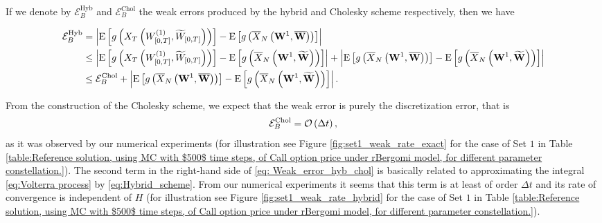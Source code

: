 \begin{conjecture}\label{conj: Weak error structure}
If we denote by $\mathcal{E}_{B}^{\text{Hyb}}$ and $\mathcal{E}_{B}^{\text{Chol}}$ the weak errors produced by the hybrid and Cholesky scheme respectively, then we have
\begin{small}
\begin{align}\label{eq: Weak_error_hyb_chol}
\mathcal{E}_{B}^{\text{Hyb}}&=\left\lvert\mathrm{E}\left[g\left(X_T\left(W^{(1)}_{[0,T]},\widetilde{W}_{[0,T]}\right) \right)\right]-\mathrm{E}\left[g\left(\overline{X}_N\left(\mathbf{W}^{1}, \overline{\mathbf{W}}\right) \right)\right]\right\rvert \nonumber\\
&\le \left\lvert\mathrm{E}\left[g\left(X_T\left(W^{(1)}_{[0,T]},\widetilde{W}_{[0,T]}\right)\right)\right]-\mathrm{E}\left[g\left(\overline{X}_N\left(\mathbf{W}^{1}, \widetilde{\mathbf{W}}\right)\right)\right]\right\rvert+ \left\lvert \mathrm{E}\left[g\left(\overline{X}_N\left(\mathbf{W}^{1}, \overline{\mathbf{W}}\right)\right)\right]- \mathrm{E}\left[g\left(\overline{X}_N\left(\mathbf{W}^{1}, \widetilde{\mathbf{W}}\right)\right)\right]\right\rvert\nonumber\\
&\le \mathcal{E}_{B}^{\text{Chol}}+ \left\lvert \mathrm{E}\left[g\left(\overline{X}_N\left(\mathbf{W}^{1}, \overline{\mathbf{W}}\right)\right)\right]- \mathrm{E}\left[g\left(\overline{X}_N\left(\mathbf{W}^{1}, \widetilde{\mathbf{W}}\right)\right)\right]\right\rvert.
\end{align}
\end{small}
From the construction of the Cholesky scheme, we expect that the weak error is purely the discretization error, that is
\begin{align*}
\mathcal{E}_{B}^{\text{Chol}}={\mathcal{O}}\left(\Delta t\right),
\end{align*}
as it was observed by our numerical experiments (for illustration see Figure \ref{fig:set1_weak_rate_exact} for the case of Set $1$  in Table \ref{table:Reference solution, using MC with $500$ time steps, of Call option price under rBergomi model, for different parameter constellation.}).  The second term in the right-hand side of  \eqref{eq: Weak_error_hyb_chol} is basically related to approximating the integral \eqref{eq:Volterra process}  by \eqref{eq:Hybrid_scheme}. From our numerical experiments it seems that this term is  at least  of order  $\Delta t$  and its rate of convergence is independent of $H$ (for illustration see Figure \ref{fig:set1_weak_rate_hybrid} for the case of Set $1$  in Table \ref{table:Reference solution, using MC with $500$ time steps, of Call option price under rBergomi model, for different parameter constellation.}).
\end{conjecture}

